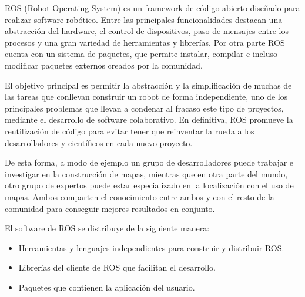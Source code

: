 


ROS (Robot Operating System) es un framework de código abierto diseñado para
realizar software robótico. Entre las principales funcionalidades destacan una
abstracción del hardware, el control de dispositivos, paso de mensajes entre los
procesos y una gran variedad de herramientas y librerías. Por otra parte ROS
cuenta con un sistema de paquetes, que permite instalar, compilar e incluso
modificar paquetes externos creados por la comunidad.

El objetivo principal es permitir la abstracción y la simplificación de  muchas de
las tareas que conllevan construir un robot de forma independiente, uno de los
principales problemas que llevan a condenar al fracaso este tipo de proyectos,
mediante el desarrollo de software colaborativo. En definitiva, ROS promueve la
reutilización de código para evitar tener que reinventar la rueda a los
desarrolladores y científicos en cada nuevo proyecto.

De esta forma, a modo de ejemplo un grupo de desarrolladores puede trabajar e
investigar en la construcción de mapas, mientras que en otra parte del mundo,
otro grupo de expertos puede estar especializado en la localización con el uso
de mapas. Ambos comparten el conocimiento entre ambos y con el resto de la
comunidad para conseguir mejores resultados en conjunto.

El software de ROS se distribuye de la siguiente manera:

\begin{itemize}
  \item Herramientas y lenguajes independientes para construir y distribuir ROS.
  \item Librerías del cliente de ROS que facilitan el desarrollo.
  \item Paquetes que contienen la aplicación del usuario.
\end{itemize}

